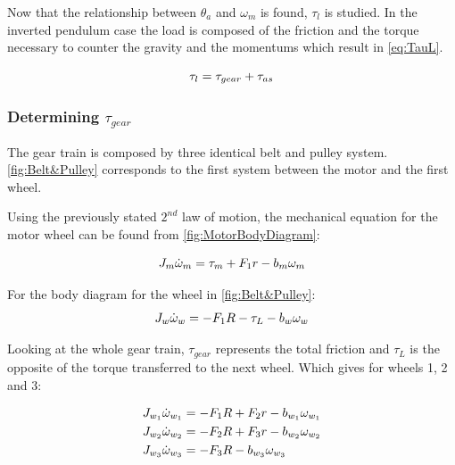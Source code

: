 Now that the relationship between $\theta_a$ and $\omega_m$ is found, $\tau_l$ is studied. In the inverted pendulum case the load is composed of the friction and the torque necessary to counter the gravity and the momentums which result in \autoref{eq:TauL}.

\begin{equation}\label{eq:TauL}
	\tau_l = \tau_{gear} + \tau_{as} \addunit{\newton\meter}
\end{equation}
\startexplain
{}
\stopexplain


\subsubsection*{Determining $\tau_{gear}$}
The gear train is composed by three identical belt and pulley system. \autoref{fig:Belt&Pulley} corresponds to the first system between the motor and the first wheel. 

Using the previously stated $2^{nd}$ law of motion, the mechanical equation for the motor wheel can be found from \autoref{fig:MotorBodyDiagram}:

\begin{equation}
    J_m \dot{\omega}_m = \tau_m + F_1r - b_m\omega_m \addunit{\newton\meter}
    \label{eq:MotorfreeBody}
\end{equation}

For the body diagram for the wheel in \autoref{fig:Belt&Pulley}:
\begin{equation}
	J_w\dot{\omega}_{w} = -F_1R -\tau_L -b_{w}\omega_{w} \addunit{\newton\meter}
\end{equation}

Looking at the whole gear train, $\tau_{gear}$ represents the total friction and $\tau_L$ is the opposite of the torque transferred to the next wheel. Which gives for wheels 1, 2 and 3:

\begin{subequations} 
	\begin{flalign} \label{eq:GiveMeAnOriginalName}
		&J_{w_1}\dot{\omega}_{w_1} = -F_1R + F_2r -b_{w_1}\omega_{w_1} \addunit{\newton\meter}\\ 
		&J_{w_2}\dot{\omega}_{w_2} = -F_2R + F_3r -b_{w_2}\omega_{w_2} \addunit{\newton\meter}\\ 
		&J_{w_3}\dot{\omega}_{w_3} = -F_3R - b_{w_3}\omega_{w_3} \addunit{\newton\meter}
	\end{flalign}
\end{subequations}

